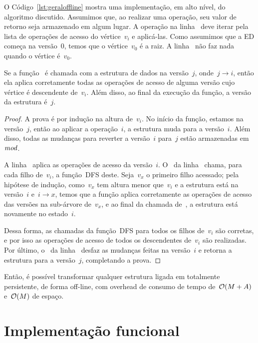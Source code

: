 \documentclass[../../main.tex]{subfiles}
\begin{document}
O Código~\ref{lst:geraloffline} mostra uma implementação, em alto nível, do algoritmo discutido. Assumimos que, ao realizar uma operação, seu valor de retorno seja armazenado em algum lugar. A operação na linha~ deve iterar pela lista de operações de acesso do vértice~$v_i$ e aplicá-las. Como assumimos que a ED começa na versão~0, temos que o vértice~$v_0$ é a raiz. A linha~ não faz nada quando o vértice é~$v_0$.

\begin{proposition}
	Se a função~{\normalfont {}} é chamada com a estrutura de dados na versão~$j$, onde~${j \rightarrow i}$, então ela aplica corretamente todas as operações de acesso de alguma versão cujo vértice é descendente de~$v_i$. Além disso, ao final da execução da função, a versão da estrutura é~$j$.
\end{proposition}

\begin{proof}
A prova é por indução na altura de~$v_i$. No início da função, estamos na versão~$j$, então ao aplicar a operação~$i$, a estrutura muda para a versão~$i$. Além disso, todas as mudanças para reverter a versão~$i$ para~$j$ estão armazenadas em~$\mathit{mod}$.

A linha~ aplica as operações de acesso da versão~$i$. O~ da linha~ chama, para cada filho de~$v_i$, a função~\textsc{DFS} deste. Seja~$v_x$ o primeiro filho acessado; pela hipótese de indução, como~$v_x$ tem altura menor que~$v_i$ e a estrutura está na versão~$i$ e~${i \rightarrow x}$, temos que a função aplica corretamente as operações de acesso das versões na sub-árvore de~$v_x$, e ao final da chamada de~, a estrutura está novamente no estado~$i$.

Dessa forma, as chamadas da função~\textsc{DFS} para todos os filhos de~$v_i$ são corretas, e por isso as operações de acesso de todos os descendentes de~$v_i$ são realizadas. Por último, o~ da linha~ desfaz as mudanças feitas na versão~$i$ e retorna a estrutura para a versão~$j$, completando a prova.
\end{proof}

Então, é possível transformar qualquer estrutura ligada em totalmente persistente, de forma off-line, com overhead de consumo de tempo de~$\mathcal{O}(M+A)$ e~$\mathcal{O}(M)$ de espaço.

\section{Implementação funcional} \label{sec:implfuncional}
\end{document}
